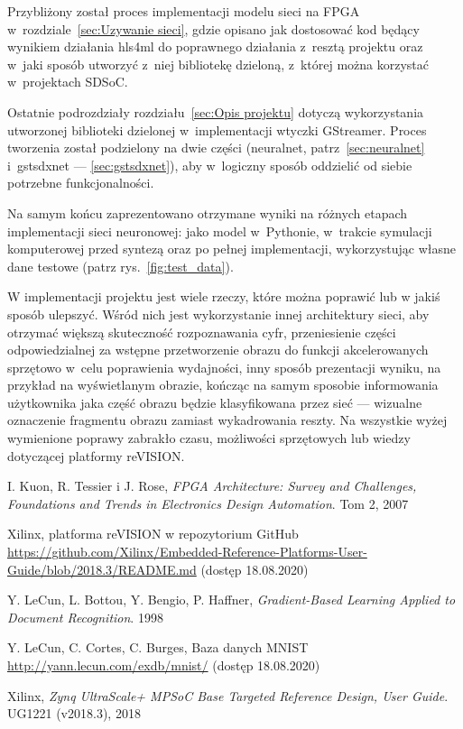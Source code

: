 \documentclass[12pt, oneside, a4paper]{article}
\begin{document}
Przybliżony został proces implementacji modelu sieci na FPGA
w~rozdziale~\ref{sec:Uzywanie sieci}, gdzie opisano jak dostosować kod będący
wynikiem działania hls4ml do poprawnego działania z~resztą projektu
oraz w~jaki sposób utworzyć z~niej bibliotekę dzieloną, z~której można
korzystać w~projektach SDSoC.

Ostatnie podrozdziały rozdziału~\ref{sec:Opis projektu} dotyczą
wykorzystania utworzonej biblioteki dzielonej w~implementacji wtyczki
GStreamer. Proces tworzenia został podzielony na dwie części (neuralnet,
patrz~\ref{sec:neuralnet} i~gstsdxnet --- \ref{sec:gstsdxnet}), aby
w~logiczny sposób oddzielić od siebie potrzebne funkcjonalności.

Na samym końcu zaprezentowano otrzymane wyniki na różnych etapach
implementacji sieci neuronowej: jako model w~Pythonie, w~trakcie symulacji
komputerowej przed syntezą oraz po pełnej implementacji, wykorzystując
własne dane testowe (patrz rys.~\ref{fig:test_data}).

W implementacji projektu jest wiele rzeczy, które można poprawić lub
w jakiś sposób ulepszyć. Wśród nich jest wykorzystanie innej architektury
sieci, aby otrzymać większą skuteczność rozpoznawania cyfr, przeniesienie
części odpowiedzialnej za wstępne przetworzenie obrazu do funkcji
akcelerowanych sprzętowo w~celu poprawienia wydajności, inny sposób
prezentacji wyniku, na przykład na wyświetlanym obrazie, kończąc
na samym sposobie informowania użytkownika jaka część obrazu będzie
klasyfikowana przez sieć --- wizualne oznaczenie fragmentu obrazu zamiast
wykadrowania reszty. Na wszystkie wyżej
wymienione poprawy zabrakło czasu, możliwości
sprzętowych lub wiedzy dotyczącej platformy reVISION.

\restoregeometry{}

\begin{thebibliography}{9}
  \raggedright

    I. Kuon, R. Tessier i J. Rose,
    \emph{FPGA Architecture: Survey and Challenges, Foundations
    and Trends\textregistered{} in Electronics Design Automation}.
    Tom 2,
    2007

    Xilinx,
    platforma reVISION w repozytorium GitHub \linebreak
    \url{https://github.com/Xilinx/Embedded-Reference-Platforms-User-Guide/blob/2018.3/README.md}
    (dostęp 18.08.2020)
    
  Y. LeCun, L. Bottou, Y. Bengio, P. Haffner,
  \emph{Gradient-Based Learning Applied to Document Recognition}.
  1998

  Y. LeCun, C. Cortes, C. Burges,
  Baza danych MNIST
  \url{http://yann.lecun.com/exdb/mnist/}
  (dostęp 18.08.2020)

  Xilinx,
  \emph{Zynq UltraScale+ MPSoC Base Targeted Reference Design, User Guide}.
  UG1221 (v2018.3),
  2018
  
\end{thebibliography}
\end{document}
